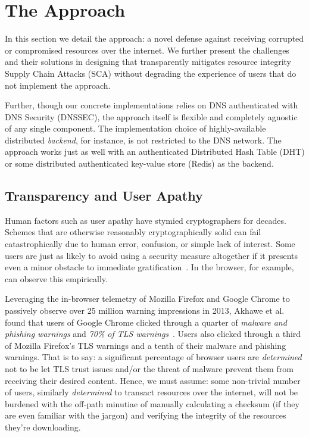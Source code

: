 \section{The \SYSTEM{} Approach} \label{sec:approach}

In this section we detail the \SYSTEM{} approach: a novel defense against
receiving corrupted or compromised resources over the internet. We further
present the challenges and their solutions in designing \SYSTEM{} that
transparently mitigates resource integrity Supply Chain Attacks (SCA) without
degrading the experience of users that do not implement the \SYSTEM{} approach.

Further, though our concrete implementations relies on DNS authenticated with
DNS Security (DNSSEC), the approach itself is flexible and completely agnostic
of any single component. The implementation choice of highly-available
distributed \emph{backend}, for instance, is not restricted to the DNS network.
The approach works just as well with an authenticated Distributed Hash Table
(DHT) or some distributed authenticated key-value store (\eg Redis) as the
backend.


\subsection{Transparency and User Apathy}

Human factors such as user apathy have stymied cryptographers for decades.
Schemes that are otherwise reasonably cryptographically solid can fail
catastrophically due to human error, confusion, or simple lack of interest. Some
users are just as likely to avoid using a security measure altogether if it
presents even a minor obstacle to immediate gratification~\cite{Clickthrough,
PGPBad}. In the browser, for example, can observe this empirically.

Leveraging the in-browser telemetry of Mozilla Firefox and Google Chrome to
passively observe over 25 million warning impressions in 2013, Akhawe et al.
found that users of Google Chrome clicked through a quarter of \emph{malware and
phishing warnings} and \emph{70\% of TLS warnings}~\cite{Clickthrough}. Users
also clicked through a third of Mozilla Firefox's TLS warnings and a tenth of
their malware and phishing warnings. That is to say: a significant percentage of
browser users are \emph{determined} not to be let TLS trust issues and/or the
threat of malware prevent them from receiving their desired content. Hence, we
must assume: some non-trivial number of users, similarly \emph{determined} to
transact resources over the internet, will not be burdened with the off-path
minutiae of manually calculating a checksum (if they are even familiar with the
jargon) and verifying the integrity of the resources they're downloading.

